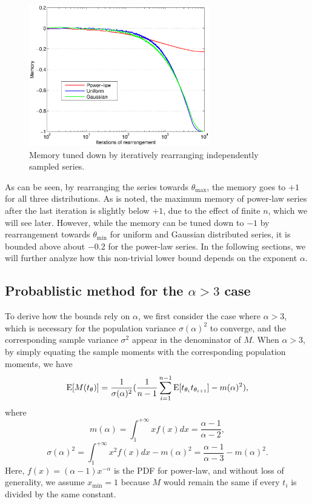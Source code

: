 \begin{figure}[!ht]
\centering
\includegraphics[width=0.7\textwidth]{figures/TuningDown-power-uni-gauss.eps}
\caption{Memory tuned down by iteratively rearranging independently sampled series.}
\label{fig:TuningDownMem}
\vspace{1em}
\end{figure}


As can be seen, by rearranging the series towards $ \theta_{\max} $, 
the memory goes to $ +1 $ for all three distributions. 
As is noted, the maximum memory of power-law series after the last iteration is slightly below $ +1 $, 
due to the effect of finite $ n $, which we will see later. 
However, while the memory can be tuned down to $ -1 $ by rearrangement towards $ \theta_{\min} $  for uniform and Gaussian distributed series, 
it is bounded above about $ -0.2 $ for the power-law series. 
In the following sections, we will further analyze how this non-trivial lower bound depends on the exponent $ \alpha $.
\subsection{Probablistic method for the $ \alpha>3 $ case}
To derive how the bounds rely on $ \alpha $, we first consider the case where $ \alpha > 3 $, which is necessary for the population variance $ \sigma({\alpha})^{2} $ to converge, and the corresponding sample variance $ \sigma^{2} $ appear in the denominator of $ M $. When $ \alpha>3 $, by simply equating the sample moments with the corresponding population moments, we have 
\begin{equation}
	\E[M(t_{\theta})] = \frac{1}{\sigma(\alpha)^2} (\frac{1}{n-1} \sum_{i=1}^{n-1} \E[t_{\theta_i}t_{\theta_{i+1}}] -m(\alpha)^2 ), \label{eqs:Mprob}
\end{equation} 
where
\begin{equation}
	m(\alpha) = \int_{1}^{+\infty} xf(x) dx = \frac{\alpha-1}{\alpha-2},
\end{equation}
\begin{equation}
	\sigma(\alpha)^2 = \int_{1}^{+\infty} x^{2}f(x) dx - m(\alpha)^{2} = \frac{\alpha-1}{\alpha-3} - m(\alpha)^2.
\end{equation}
Here, $ f(x) = (\alpha-1)x^{-\alpha} $ is the PDF for power-law, and without loss of generality, we assume $ x_{\min}=1 $ because $ M $ would remain the same if every $ t_{i} $ is divided by the same constant.

